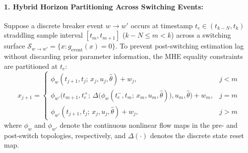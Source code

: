 \documentclass[11pt]{article}
\begin{document}
\paragraph{1. Hybrid Horizon Partitioning Across Switching Events:}
Suppose a discrete breaker event $w \to w'$ occurs at timestamp $t_e \in (t_{k-N}, t_k)$ straddling sample interval $[t_m, t_{m+1}]$ ($k-N \le m < k$) across a switching surface $\mathcal{S}_{w \to w'} = \{x : g_{\mathrm{event}}(x) = 0\}$. To prevent post-switching estimation lag without discarding prior parameter information, the MHE equality constraints are partitioned at $t_e$:
\begin{equation}
x_{j+1} =
\begin{cases}
\phi_w(t_{j+1}, t_j;\, x_j, u_j, \hat{\theta}) + w_j, & j < m \\
\phi_{w'}\!\Big(t_{m+1}, t_e^{+};\, \Delta\big(\phi_w(t_e^{-}, t_m;\, x_m, u_m, \hat{\theta})\big), u_m, \hat{\theta}\Big) + w_m, & j = m \\
\phi_{w'}(t_{j+1}, t_j;\, x_j, u_j, \hat{\theta}) + w_j, & j > m
\end{cases}
\end{equation}
where $\phi_w$ and $\phi_{w'}$ denote the continuous nonlinear flow maps in the pre- and post-switch topologies, respectively, and $\Delta(\cdot)$ denotes the discrete state reset map.
\end{document}
